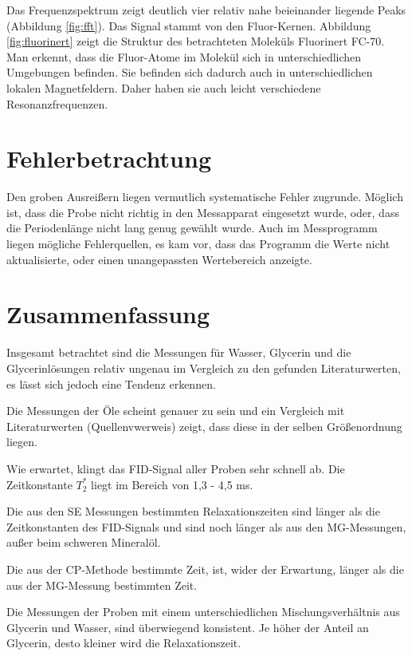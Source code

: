 \documentclass[10pt,twoside]{article}
\renewcommand{\1}{^{-1}}
\renewcommand{\2}{^{-2}}
\newcommand{\3}{^{-3}}
\newcommand{\4}{^{-4}}
\newcommand{\5}{^{-5}}
\newcommand{\6}{^{-6}}
\newcommand{\7}{^{-7}}
\newcommand{\8}{^{-8}}
\newcommand{\9}{^{-9}}
\begin{document}
Das Frequenzspektrum zeigt deutlich vier relativ nahe beieinander liegende Peaks (Abbildung \ref{fig:fft}).
Das Signal stammt von den Fluor-Kernen.
Abbildung \ref{fig:fluorinert} zeigt die Struktur des betrachteten Moleküls Fluorinert FC-70. Man erkennt, dass die Fluor-Atome im Molekül sich in unterschiedlichen Umgebungen befinden. Sie befinden sich dadurch auch in unterschiedlichen lokalen Magnetfeldern. Daher haben sie auch leicht verschiedene Resonanzfrequenzen.

\section{Fehlerbetrachtung}

Den groben Ausreißern liegen vermutlich systematische Fehler zugrunde. Möglich ist, dass die Probe nicht richtig in den Messapparat eingesetzt wurde, oder, dass die Periodenlänge nicht lang genug gewählt wurde. Auch im Messprogramm liegen mögliche Fehlerquellen, es kam vor, dass das Programm die Werte nicht aktualisierte, oder einen unangepassten Wertebereich anzeigte.

\section{Zusammenfassung}

Insgesamt betrachtet sind die Messungen für Wasser, Glycerin und die Glycerinlösungen relativ ungenau im Vergleich zu den gefunden Literaturwerten, es lässt sich jedoch eine Tendenz erkennen.

Die Messungen der Öle scheint genauer zu sein und ein Vergleich mit Literaturwerten (Quellenvwerweis) zeigt, dass diese in der selben Größenordnung liegen.

Wie erwartet, klingt das FID-Signal aller Proben sehr schnell ab. Die Zeitkonstante $T_2^*$ liegt im Bereich von 1,3 - 4,5 ms.

Die aus den SE Messungen bestimmten Relaxationszeiten sind länger als die Zeitkonstanten des FID-Signals und sind noch länger als aus den MG-Messungen, außer beim schweren Mineralöl.

Die aus der CP-Methode bestimmte Zeit, ist, wider der Erwartung, länger als die aus der MG-Messung bestimmten Zeit.

Die Messungen der Proben mit einem unterschiedlichen Mischungsverhältnis aus Glycerin und Wasser, sind überwiegend konsistent. Je höher der Anteil an Glycerin, desto kleiner wird die Relaxationszeit.
\end{document}
